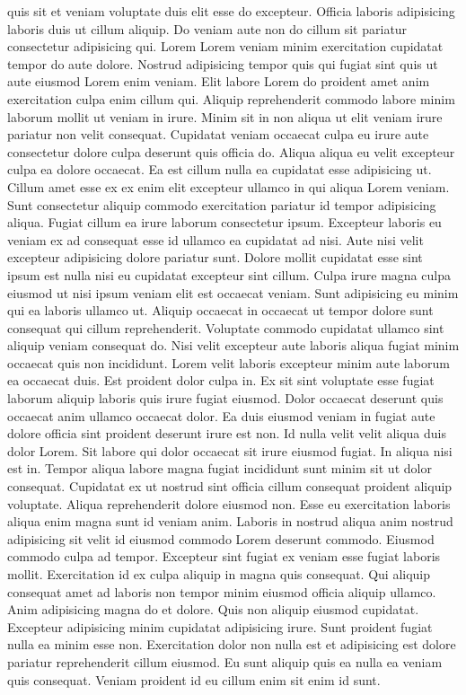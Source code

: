 quis sit et veniam voluptate duis elit esse do excepteur. Officia laboris adipisicing laboris duis ut cillum aliquip. Do veniam aute non do cillum sit pariatur consectetur adipisicing qui. Lorem Lorem veniam minim exercitation cupidatat tempor do aute dolore. Nostrud adipisicing tempor quis qui fugiat sint quis ut aute eiusmod Lorem enim veniam. Elit labore Lorem do proident amet anim exercitation culpa enim cillum qui. Aliquip reprehenderit commodo labore minim laborum mollit ut veniam in irure. Minim sit in non aliqua ut elit veniam irure pariatur non velit consequat. Cupidatat veniam occaecat culpa eu irure aute consectetur dolore culpa deserunt quis officia do. Aliqua aliqua eu velit excepteur culpa ea dolore occaecat. Ea est cillum nulla ea cupidatat esse adipisicing ut. Cillum amet esse ex ex enim elit excepteur ullamco in qui aliqua Lorem veniam. Sunt consectetur aliquip commodo exercitation pariatur id tempor adipisicing aliqua. Fugiat cillum ea irure laborum consectetur ipsum. Excepteur laboris eu veniam ex ad consequat esse id ullamco ea cupidatat ad nisi. Aute nisi velit excepteur adipisicing dolore pariatur sunt. Dolore mollit cupidatat esse sint ipsum est nulla nisi eu cupidatat excepteur sint cillum. Culpa irure magna culpa eiusmod ut nisi ipsum veniam elit est occaecat veniam. Sunt adipisicing eu minim qui ea laboris ullamco ut. Aliquip occaecat in occaecat ut tempor dolore sunt consequat qui cillum reprehenderit. Voluptate commodo cupidatat ullamco sint aliquip veniam consequat do. Nisi velit excepteur aute laboris aliqua fugiat minim occaecat quis non incididunt. Lorem velit laboris excepteur minim aute laborum ea occaecat duis. Est proident dolor culpa in. Ex sit sint voluptate esse fugiat laborum aliquip laboris quis irure fugiat eiusmod. Dolor occaecat deserunt quis occaecat anim ullamco occaecat dolor. Ea duis eiusmod veniam in fugiat aute dolore officia sint proident deserunt irure est non. Id nulla velit velit aliqua duis dolor Lorem. Sit labore qui dolor occaecat sit irure eiusmod fugiat. In aliqua nisi est in. Tempor aliqua labore magna fugiat incididunt sunt minim sit ut dolor consequat. Cupidatat ex ut nostrud sint officia cillum consequat proident aliquip voluptate. Aliqua reprehenderit dolore eiusmod non. Esse eu exercitation laboris aliqua enim magna sunt id veniam anim. Laboris in nostrud aliqua anim nostrud adipisicing sit velit id eiusmod commodo Lorem deserunt commodo. Eiusmod commodo culpa ad tempor. Excepteur sint fugiat ex veniam esse fugiat laboris mollit. Exercitation id ex culpa aliquip in magna quis consequat. Qui aliquip consequat amet ad laboris non tempor minim eiusmod officia aliquip ullamco. Anim adipisicing magna do et dolore. Quis non aliquip eiusmod cupidatat. Excepteur adipisicing minim cupidatat adipisicing irure. Sunt proident fugiat nulla ea minim esse non. Exercitation dolor non nulla est et adipisicing est dolore pariatur reprehenderit cillum eiusmod. Eu sunt aliquip quis ea nulla ea veniam quis consequat. Veniam proident id eu cillum enim sit enim id sunt.